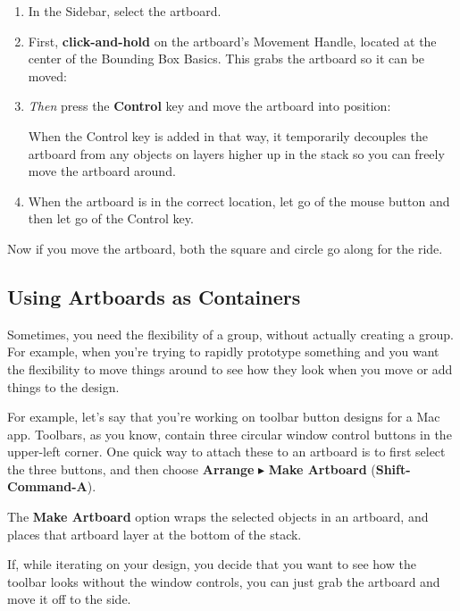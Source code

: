 \documentclass[../main.tex]{subfiles}
\begin{document}
\begin{enumerate}
  \item In the Sidebar, select the artboard.
  \item First, \textbf{click-and-hold} on the artboard's Movement Handle, located at the center
    of the Bounding Box Basics. This grabs the artboard so it can be moved:

  \item \textit{Then} press the \textbf{Control} key and move the artboard into position:


    When the Control key is added in that way, it temporarily decouples the artboard from any
    objects on layers higher up in the stack so you can freely move the artboard around.
  \item When the artboard is in the correct location, let go of the mouse button and then let go
    of the Control key.
\end{enumerate}

Now if you move the artboard, both the square and circle go along for the ride.

\subsection{Using Artboards as Containers}

Sometimes, you need the flexibility of a group, without actually creating a group. For example,
when you're trying to rapidly prototype something and you want the flexibility to move things
around to see how they look when you move or add things to the design.

For example, let's say that you're working on toolbar button designs for a Mac app. Toolbars, as
you know, contain three circular window control buttons in the upper-left corner. One quick
way to attach these to an artboard is to first select the three buttons, and then choose
\textbf{Arrange} $\blacktriangleright$ \textbf{Make Artboard} (\textbf{Shift-Command-A}).


The \textbf{Make Artboard} option wraps the selected objects in an artboard, and places that
artboard layer at the bottom of the stack.


If, while iterating on your design, you decide that you want to see how the toolbar looks
without the window controls, you can just grab the artboard and move it off to the side.
\end{document}
